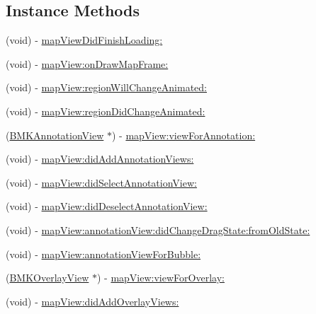 \subsection*{Instance Methods}
\begin{DoxyCompactItemize}
\item 
(void) -\/ \hyperlink{protocol_b_m_k_map_view_delegate-p_afb277fb60e14f6b2cc4bf06dede22fdd}{map\+View\+Did\+Finish\+Loading\+:}
\item 
(void) -\/ \hyperlink{protocol_b_m_k_map_view_delegate-p_a5918471c1fea23eae8bf7582c1fff17e}{map\+View\+:on\+Draw\+Map\+Frame\+:}
\item 
(void) -\/ \hyperlink{protocol_b_m_k_map_view_delegate-p_ae87e30d1d70dd4e8dcff06b5e0cf51a7}{map\+View\+:region\+Will\+Change\+Animated\+:}
\item 
(void) -\/ \hyperlink{protocol_b_m_k_map_view_delegate-p_a6639906de681668b08204765528ce825}{map\+View\+:region\+Did\+Change\+Animated\+:}
\item 
(\hyperlink{interface_b_m_k_annotation_view}{B\+M\+K\+Annotation\+View} $\ast$) -\/ \hyperlink{protocol_b_m_k_map_view_delegate-p_a58eb111045e3e124bcf8abba4d1188d5}{map\+View\+:view\+For\+Annotation\+:}
\item 
(void) -\/ \hyperlink{protocol_b_m_k_map_view_delegate-p_ad982960181ac5b4087f4087e06f16603}{map\+View\+:did\+Add\+Annotation\+Views\+:}
\item 
(void) -\/ \hyperlink{protocol_b_m_k_map_view_delegate-p_a825411129229ae80dbd104596c0d788a}{map\+View\+:did\+Select\+Annotation\+View\+:}
\item 
(void) -\/ \hyperlink{protocol_b_m_k_map_view_delegate-p_a8b3c67fbfebc7d7479a1935269d8302d}{map\+View\+:did\+Deselect\+Annotation\+View\+:}
\item 
(void) -\/ \hyperlink{protocol_b_m_k_map_view_delegate-p_add2407adba384f1dd3c0953590e4a60d}{map\+View\+:annotation\+View\+:did\+Change\+Drag\+State\+:from\+Old\+State\+:}
\item 
(void) -\/ \hyperlink{protocol_b_m_k_map_view_delegate-p_adf11fcfbabf17146fd10d24f5b70aaf2}{map\+View\+:annotation\+View\+For\+Bubble\+:}
\item 
(\hyperlink{interface_b_m_k_overlay_view}{B\+M\+K\+Overlay\+View} $\ast$) -\/ \hyperlink{protocol_b_m_k_map_view_delegate-p_a643e260b01350f089451d745574e3d72}{map\+View\+:view\+For\+Overlay\+:}
\item 
(void) -\/ \hyperlink{protocol_b_m_k_map_view_delegate-p_a4eb0201fbe51ecd74d3b678a139435bf}{map\+View\+:did\+Add\+Overlay\+Views\+:}

\end{DoxyCompactItemize}
